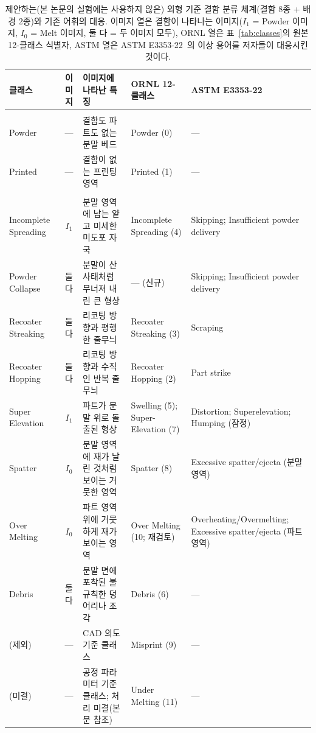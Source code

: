 \begin{table}[tp]
\centering
\caption{제안하는(본 논문의 실험에는 사용하지 않은) 외형 기준 결함 분류
체계(결함 8종 + 배경 2종)와 기존 어휘의 대응. 이미지 열은 결함이
나타나는 이미지($I_1$ = Powder 이미지, $I_0$ = Melt 이미지, 둘 다 = 두
이미지 모두), ORNL 열은 표~\ref{tab:classes}의 원본 12-클래스 식별자,
ASTM 열은 ASTM E3353-22~\cite{ASTME3353}의 이상 용어를 저자들이
대응시킨 것이다.}
\label{tab:taxonomy}
\footnotesize
\setlength{\tabcolsep}{3pt}
\begin{tabularx}{\textwidth}{@{}>{\raggedright\arraybackslash}p{2.1cm}c>{\raggedright\arraybackslash}X>{\raggedright\arraybackslash}p{2.2cm}>{\raggedright\arraybackslash}p{2.5cm}@{}}
\toprule
클래스 & 이미지 & 이미지에 나타난 특징 & ORNL 12-클래스 & ASTM E3353-22 \\
\midrule
\multicolumn{5}{@{}l}{\emph{배경}} \\
Powder  & --- & 결함도 파트도 없는 분말 베드 & Powder (0) & --- \\
Printed & --- & 결함이 없는 프린팅 영역 & Printed (1) & --- \\
\multicolumn{5}{@{}l}{\emph{결함}} \\
Incomplete Spreading & $I_1$ & 분말 영역에 남는 얕고 미세한 미도포 자국 & Incomplete Spreading (4) & Skipping; Insufficient powder delivery \\
Powder Collapse      & 둘 다 & 분말이 산사태처럼 무너져 내린 큰 형상 & --- (신규) & Skipping; Insufficient powder delivery \\
Recoater Streaking   & 둘 다 & 리코팅 방향과 평행한 줄무늬 & Recoater Streaking (3) & Scraping \\
Recoater Hopping     & 둘 다 & 리코팅 방향과 수직인 반복 줄무늬 & Recoater Hopping (2) & Part strike \\
Super Elevation      & $I_1$ & 파트가 분말 위로 돌출된 형상 & Swelling (5); Super-Elevation (7) & Distortion; Superelevation; Humping (잠정) \\
Spatter              & $I_0$ & 분말 영역에 재가 날린 것처럼 보이는 거뭇한 영역 & Spatter (8) & Excessive spatter/ejecta (분말 영역) \\
Over Melting         & $I_0$ & 파트 영역 위에 거뭇하게 재가 보이는 영역 & Over Melting (10; 재검토) & Overheating\slash Overmelting; Excessive spatter/ejecta (파트 영역) \\
Debris               & 둘 다 & 분말 면에 포착된 불규칙한 덩어리나 조각 & Debris (6) & --- \\
\midrule
(제외) & --- & CAD 의도 기준 클래스 & Misprint (9) & --- \\
(미결) & --- & 공정 파라미터 기준 클래스; 처리 미결(본문 참조) & Under Melting (11) & --- \\
\bottomrule
\end{tabularx}
\end{table}

